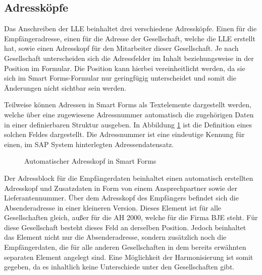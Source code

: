 	\subsection{Adressköpfe}
	\label{ist:adr}
	
	Das Anschreiben der \ac{LLE} beinhaltet drei verschiedene Adressköpfe. Einen für die Empfängeradresse, einen für die Adresse der Gesellschaft, welche die \ac{LLE} erstellt hat, sowie einen Adresskopf für den Mitarbeiter dieser Gesellschaft. Je nach Gesellschaft unterscheiden sich die Adressfelder im Inhalt beziehungsweise in der Position im Formular. Die Position kann hierbei vereinheitlicht werden, da sie sich im Smart Forms-Formular nur geringfügig unterscheidet und somit die Änderungen nicht sichtbar sein werden. 
	
	Teilweise können Adressen in Smart Forms als Textelemente dargestellt werden, welche über eine zugewiesene Adressnummer automatisch die zugehörigen Daten in einer definierbaren Struktur ausgeben. In Abbildung \ref{auto} ist die Definition eines solchen Feldes dargestellt. Die Adressnummer ist eine eindeutige Kennung für einen, im SAP System hinterlegten Adressendatensatz.
			\begin{figure}[ht]
			\centering
			\caption{Automatischer Adresskopf in Smart Forms}
			\label{auto}
		\end{figure} 
	\FloatBarrier
	
	 Der Adressblock für die Empfängerdaten beinhaltet einen automatisch erstellten Adresskopf und Zusatzdaten in Form von einem Ansprechpartner sowie der Lieferantennummer. Über dem Adresskopf des Empfängers befindet sich die Absenderadresse in einer kleineren Version. Dieses Element ist für alle Gesellschaften gleich, außer für die \ac{AH} 2000, welche für die Firma \ac{BJE} steht. Für diese Gesellschaft besteht dieses Feld an derselben Position. Jedoch beinhaltet das Element nicht nur die Absenderadresse, sondern zusätzlich noch die Empfängerdaten, die für alle anderen Gesellschaften in dem bereits erwähnten separaten Element angelegt sind. Eine Möglichkeit der Harmonisierung ist somit gegeben, da es inhaltlich keine Unterschiede unter den Gesellschaften gibt.
	

